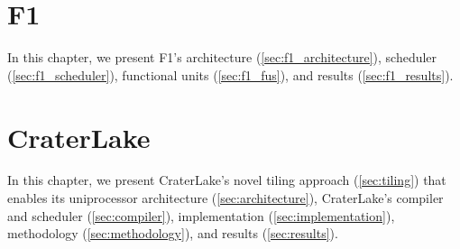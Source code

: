 \documentclass[12pt,twoside]{mitthesis}
\begin{document}

% 
\pagestyle{plain}




\chapter{F1}

In this chapter, we present F1's architecture (\autoref{sec:f1_architecture}),
scheduler (\autoref{sec:f1_scheduler}), functional units (\autoref{sec:f1_fus}),
and results (\autoref{sec:f1_results}).






\chapter{CraterLake}\label{ch:craterlake}

In this chapter, we present CraterLake's novel tiling approach
(\autoref{sec:tiling}) that enables its uniprocessor architecture
(\autoref{sec:architecture}), CraterLake's compiler and scheduler
(\autoref{sec:compiler}), implementation (\autoref{sec:implementation}),
methodology (\autoref{sec:methodology}), and results (\autoref{sec:results}).










\begin{singlespacing}

\end{singlespacing}
\end{document}
